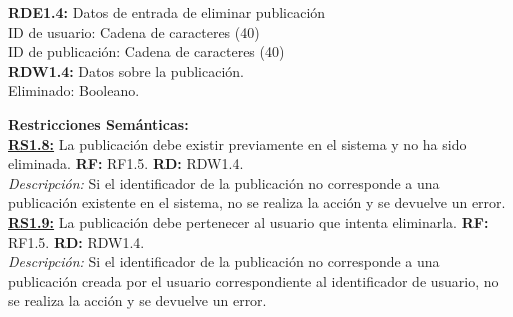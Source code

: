 \textcolor{azul}{\textbf{RDE1.4:}} Datos de entrada de eliminar publicación \\
\hspace*{1cm} ID de usuario: Cadena de caracteres (40) \\
\hspace*{1cm} ID de publicación: Cadena de caracteres (40) \\[12pt]

\textcolor{azul}{\textbf{RDW1.4:}} Datos sobre la publicación. \\
\hspace*{1cm} Eliminado: Booleano. \\
\pagebreak

\textbf{\textcolor{verde}{Restricciones Semánticas:}} \\[6pt]
\textbf{\textcolor{verde}{\underline{RS1.8:}}} La publicación debe existir previamente en el sistema y no ha sido eliminada. \textbf{RF:} RF1.5. \textbf{RD:} RDW1.4. \\
\hspace*{1cm} \textit{Descripción:} Si el identificador de la publicación no corresponde
a una publicación existente en el sistema, no se realiza la acción y se devuelve un error. \\[12pt]

\textbf{\textcolor{verde}{\underline{RS1.9:}}} La publicación debe pertenecer al usuario que intenta eliminarla. \textbf{RF:} RF1.5. \textbf{RD:} RDW1.4. \\
\hspace*{1cm} \textit{Descripción:} Si el identificador de la publicación no corresponde
a una publicación creada por el usuario correspondiente al identificador de usuario, no se realiza la acción y se devuelve un error. \\[12pt]
